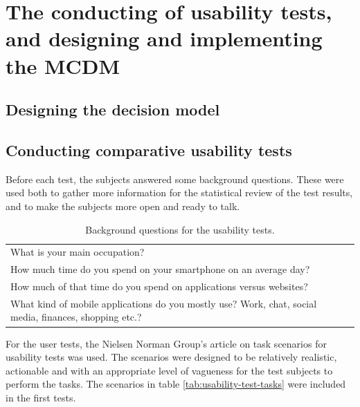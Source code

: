 \section{The conducting of usability tests, and designing and implementing the MCDM }


\subsection{Designing the decision model}

\subsection{Conducting comparative usability tests}
Before each test, the subjects answered some background questions. These were used both to gather more information for the statistical review of the test results, and to make the subjects more open and ready to talk.
\newline
\renewcommand{\arraystretch}{1.5}
\begin{table}[ht!]
    \centering
    \begin{tabularx}{0.9\textwidth} { 
        | >{\raggedright\arraybackslash}X 
        | >{\centering\arraybackslash}X 
        | >{\raggedleft\arraybackslash}X | }
        \hline
        What is your main occupation? \\
        How much time do you spend on your smartphone on an average day? \\
        How much of that time do you spend on applications versus websites? \\
        What kind of mobile applications do you mostly use? Work, chat, social media, finances,  shopping etc.?\\
        \hline
    \end{tabularx}
    \caption{\label{tab:background-questions} Background questions for the usability tests.}
\end{table}

For the user tests, the Nielsen Norman Group’s article on task scenarios for usability tests was used. The scenarios were designed to be relatively realistic, actionable and with an appropriate level of vagueness for the test subjects to perform the tasks. The scenarios in table \ref{tab:usability-test-tasks} were included in the first tests.

